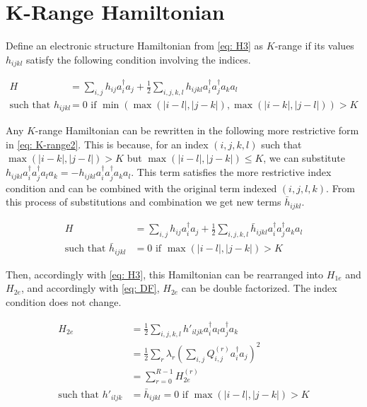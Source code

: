 

\section{K-Range Hamiltonian}

Define an electronic structure Hamiltonian from \eqref{eq: H3} as $K$-range if its values $h_{ijkl}$ satisfy the following condition involving the indices.

\begin{equation}
    \begin{split}
        H &= \sum_{i, j} h_{ij}a^\dag_ia_j + \frac{1}{2}\sum_{i,j,k,l} h_{ijkl}a^\dag_ia^\dag_ja_ka_l  \\
        \text{such that } h_{ijkl} &= 0 \text{ if } \min(\max(|i - l|, |j - k|), \max(|i - k|, |j - l|)) > K
    \end{split}
    \label{eq: K-range1}
\end{equation}

Any $K$-range Hamiltonian can be rewritten in the following more restrictive form in \eqref{eq: K-range2}. This is because, for an index $(i, j, k, l)$ such that $\max(|i - k|, |j - l|) > K$ but $\max(|i - l|, |j - k|) \leq K$, we can substitute $h_{ijkl}a^\dag_ia^\dag_ja_la_k = -h_{ijkl}a^\dag_ia^\dag_ja_ka_l$. This term satisfies the more restrictive index condition and can be combined with the original term indexed $(i, j, l, k)$. From this process of substitutions and combination we get new terms $\bar{h}_{ijkl}$.

\begin{equation}
    \begin{split}
        H &= \sum_{i, j} h_{ij}a^\dag_ia_j + \frac{1}{2}\sum_{i,j,k,l} \bar{h}_{ijkl}a^\dag_ia^\dag_ja_ka_l \\
        \text{such that } \bar{h}_{ijkl} &= 0 \text{ if } \max(|i - l|, |j - k|) > K
    \end{split}
    \label{eq: K-range2}
\end{equation}

Then, accordingly with \eqref{eq: H3}, this Hamiltonian can be rearranged into $H_{1e}$ and $H_{2e}$, and accordingly with \eqref{eq: DF}, $H_{2e}$ can be double factorized. The index condition does not change.

\begin{equation}
    \begin{split}
        H_{2e} &= \frac{1}{2}\sum_{i,j,k,l} h'_{iljk}a^\dag_ia_la^\dag_ja_k \\
        &= \frac{1}{2}\sum_r\lambda_r\left(\sum_{i,j} Q^{(r)}_{i, j}a^\dag_ia_j\right)^2 \\
        &= \sum_{r = 0}^{R - 1} H_{2e}^{(r)} \\
        \text{such that } h'_{iljk} &= \bar{h}_{ijkl} = 0 \text{ if } \max(|i - l|, |j - k|) > K
    \end{split}
\end{equation}


